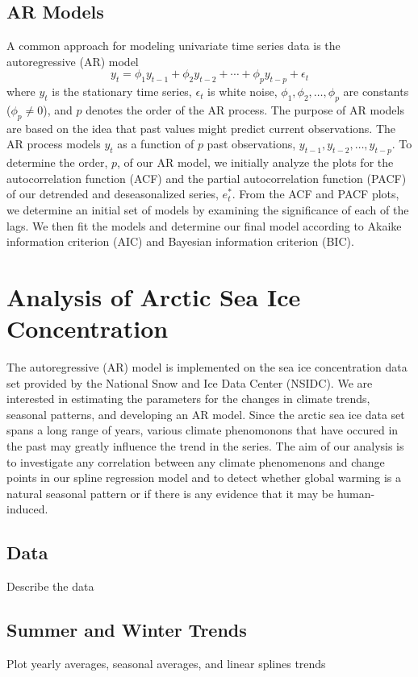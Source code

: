 \documentclass[12pt]{article}
\begin{document}
\subsection{AR Models}
A common approach for modeling univariate time series data is the autoregressive (AR) model
$$y_t = \phi_{1}y_{t-1} + \phi_{2}y_{t-2} + \cdots + \phi_{p}y_{t-p} + \epsilon_t$$
where $y_t$ is the stationary time series, $\epsilon_t$ is white noise, $\phi_1, \phi_2, \dots, \phi_p$ are constants ($\phi_p \neq 0$), and $p$ denotes the order of the AR process. The purpose of AR models are based on the idea that past values might predict current observations. The AR process models $y_t$ as a function of $p$ past observations, $y_{t-1}, y_{t-2}, \dots, y_{t-p}$. To determine the order, $p$, of our AR model, we initially analyze the plots for the autocorrelation function (ACF) and the partial autocorrelation function (PACF) of our detrended and deseasonalized series, $e^{*}_{t}$. From the ACF and PACF plots, we determine an initial set of models by examining the significance of each of the lags. We then fit the models and determine our final model according to Akaike information criterion (AIC) and Bayesian information criterion (BIC).


\section{Analysis of Arctic Sea Ice Concentration}
The autoregressive (AR) model is implemented on the sea ice concentration data set provided by the National Snow and Ice Data Center (NSIDC). We are interested in estimating the parameters for the changes in climate trends, seasonal patterns, and developing an AR model. Since the arctic sea ice data set spans a long range of years, various climate phenomonons that have occured in the past may greatly influence the trend in the series. The aim of our analysis is to investigate any correlation between any climate phenomenons and change points in our spline regression model and to detect whether global warming is a natural seasonal pattern or if there is any evidence that it may be human-induced.

\subsection{Data}
Describe the data

\subsection{Summer and Winter Trends}
Plot yearly averages, seasonal averages, and linear splines trends
\end{document}
